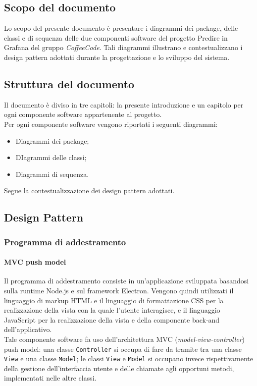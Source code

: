 \documentclass[../specifica-tecnica.tex]{subfiles}
\begin{document}
\subsection{Scopo del documento}
Lo scopo del presente documento è presentare i diagrammi dei package, delle classi e di sequenza delle due componenti software del progetto
 Predire in Grafana del gruppo \emph{CoffeeCode}. Tali diagrammi illustrano e contestualizzano i design pattern adottati durante la progettazione
 e lo sviluppo del sistema.

\subsection{Struttura del documento}
Il documento è diviso in tre capitoli: la presente introduzione e un capitolo per ogni componente software appartenente al progetto. \\
Per ogni componente software vengono riportati i seguenti diagrammi:
\begin{itemize}
  \item Diagrammi dei package;
  \item DIagrammi delle classi;
  \item Diagrammi di sequenza.
\end{itemize}
Segue la contestualizzazione dei design pattern adottati.

\subsection{Design Pattern}
\subsubsection{Programma di addestramento}
\paragraph{MVC push model}
Il programma di addestramento consiste in un'applicazione sviluppata basandosi sulla runtime Node.js e sul framework Electron. Vengono quindi utilizzati il 
linguaggio di markup HTML e il linguaggio di formattazione CSS per la realizzazione della vista con la quale l'utente interagisce, e il linguaggio JavaScript 
per la realizzazione della vista e della componente back-and dell'applicativo. \\
Tale componente software fa uso dell'architettura MVC (\textit{model-view-controller}) push model: una classe \texttt{Controller} si occupa di fare da tramite tra una classe \texttt{View} e 
una classe \texttt{Model}; le classi \texttt{View} e \texttt{Model} si occupano invece rispettivamente della gestione dell'interfaccia utente e delle chiamate agli opportuni metodi, implementati nelle 
altre classi.
\end{document}
